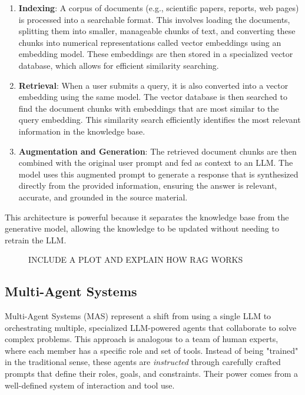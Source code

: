 \begin{enumerate}
    \item \textbf{Indexing}: A corpus of documents (e.g., scientific papers, reports, web pages) is processed into a searchable format. This involves loading the documents, splitting them into smaller, manageable chunks of text, and converting these chunks into numerical representations called vector embeddings using an embedding model. These embeddings are then stored in a specialized vector database, which allows for efficient similarity searching.
    \item \textbf{Retrieval}: When a user submits a query, it is also converted into a vector embedding using the same model. The vector database is then searched to find the document chunks with embeddings that are most similar to the query embedding. This similarity search efficiently identifies the most relevant information in the knowledge base.
    \item \textbf{Augmentation and Generation}: The retrieved document chunks are then combined with the original user prompt and fed as context to an LLM. The model uses this augmented prompt to generate a response that is synthesized directly from the provided information, ensuring the answer is relevant, accurate, and grounded in the source material.
\end{enumerate}

This architecture is powerful because it separates the knowledge base from the generative model, allowing the knowledge to be updated without needing to retrain the LLM.

\begin{figure}[h]
    \centering
    \label{fig:rag_diagram}
    INCLUDE A PLOT AND EXPLAIN HOW RAG WORKS
\end{figure}

\subsection{Multi-Agent Systems}
Multi-Agent Systems (MAS) represent a shift from using a single LLM to orchestrating multiple, specialized LLM-powered agents that collaborate to solve complex problems. This approach is analogous to a team of human experts, where each member has a specific role and set of tools. Instead of being "trained" in the traditional sense, these agents are \textit{instructed} through carefully crafted prompts that define their roles, goals, and constraints. Their power comes from a well-defined system of interaction and tool use.

